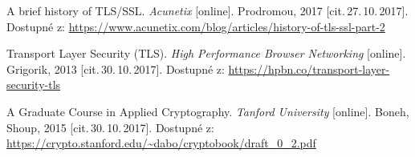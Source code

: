 \begin{literatura}{9}
	   
	A brief history of TLS/SSL.
	\emph{Acunetix} [online]. Prodromou, 2017 [cit.\,27.\,10.\,2017]. 
	Dostupné z: \url{https://www.acunetix.com/blog/articles/history-of-tls-ssl-part-2}
	
	Transport Layer Security (TLS).
	\emph{High Performance Browser Networking} [online]. Grigorik, 2013 
	[cit.\,30.\,10.\,2017].
	Dostupné z: \url{https://hpbn.co/transport-layer-security-tls}
    
	A Graduate Course in Applied Cryptography.
	\emph{Tanford University} [online]. Boneh, Shoup, 2015 [cit.\,30.\,10.\,2017]. 
	Dostupné z: \url{https://crypto.stanford.edu/~dabo/cryptobook/draft_0_2.pdf}

\end{literatura}
